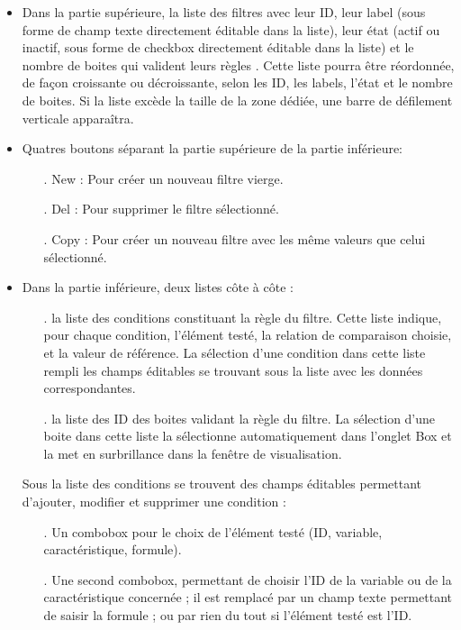 \documentclass[a4paper]{article}
\begin{document}
\begin{itemize}
\item Dans la partie supérieure, la liste des filtres avec leur ID, leur label (sous forme de champ texte directement éditable dans la liste), leur état \danger (actif ou inactif, sous forme de checkbox directement éditable dans la liste) et le nombre de boites qui valident leurs règles \danger. Cette liste pourra être réordonnée, de façon croissante ou décroissante, selon les ID, les labels, l'état et le nombre de boites. Si la liste excède la taille de la zone dédiée, une barre de défilement verticale apparaîtra.
\item Quatres boutons séparant la partie supérieure de la partie inférieure:
  \begin{itemize} 
  \item[.] New : Pour créer un nouveau filtre vierge.
  \item[.] Del : Pour supprimer le filtre sélectionné.
  \item[.] Copy : Pour créer un nouveau filtre avec les même valeurs que celui sélectionné.
  \end{itemize}
\item Dans la partie inférieure, deux listes côte à côte :
  \begin{itemize}
  \item[.] la liste des conditions constituant la règle du filtre. Cette liste indique, pour chaque condition, l'élément testé, la relation de comparaison choisie, et la valeur de référence. La sélection d'une condition dans cette liste rempli les champs éditables se trouvant sous la liste avec les données correspondantes.
  \item[.] la liste des ID des boites validant la règle du filtre. La sélection d'une boite dans cette liste la sélectionne automatiquement dans l'onglet Box et la met en surbrillance dans la fenêtre de visualisation.
  \end{itemize}
  Sous la liste des conditions se trouvent des champs éditables permettant d'ajouter, modifier et supprimer une condition : \danger
  \begin{itemize}
  \item[.] Un combobox pour le choix de l'élément testé (ID, variable, caractéristique, formule).
  \item[.] Une second combobox, permettant de choisir l'ID de la variable ou de la caractéristique concernée ; il est remplacé par un champ texte permettant de saisir la formule ; ou par rien du tout si l'élément testé est l'ID.

\end{itemize}
\end{itemize}
\end{document}
